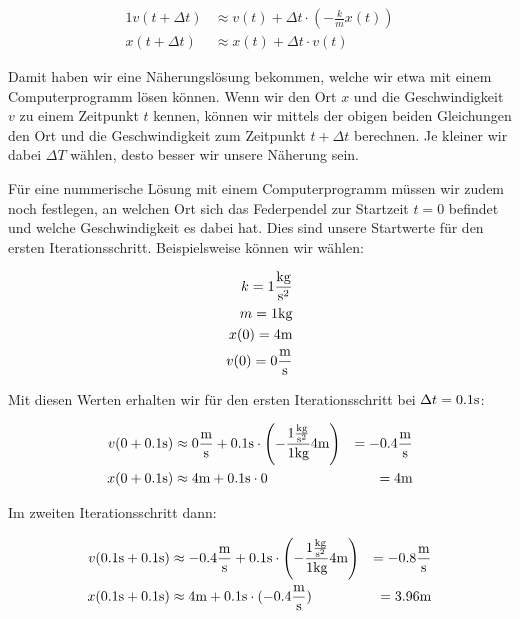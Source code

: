 \begin{alignat*}{1}
    v(t + \Delta t) &\approx v(t) + \Delta t \cdot \left(-\frac{k}{m}x(t)\right) \\
    x(t + \Delta t) &\approx x(t) + \Delta t \cdot v(t)
\end{alignat*}

Damit haben wir eine Näherungslösung bekommen, welche wir etwa mit einem Computerprogramm lösen können. Wenn wir den Ort $x$ und die Geschwindigkeit $v$ zu einem Zeitpunkt $t$ kennen, können wir mittels der obigen beiden Gleichungen den Ort und die Geschwindigkeit zum Zeitpunkt $t+\Delta t$ berechnen. Je kleiner wir dabei $\Delta T$ wählen, desto besser wir unsere Näherung sein.

Für eine nummerische Lösung mit einem Computerprogramm müssen wir zudem noch festlegen, an welchen Ort sich das Federpendel zur Startzeit $t=0$ befindet und welche Geschwindigkeit es dabei hat. Dies sind unsere Startwerte für den ersten Iterationsschritt. Beispielsweise können wir wählen:

\begin{alignat*}{1}
    k = 1 \frac{\text{kg}}{\text{s}^2} \\
    m = 1 \text{kg} \\
    x(0) = 4 \text{m} \\
    v(0) = 0 \frac{\text{m}}{\text{s}}
\end{alignat*}

Mit diesen Werten erhalten wir für den ersten Iterationsschritt  bei $\Delta t=0.1\text{s}$:

\begin{alignat*}{2}
    v(0 + 0.1 \text{s}) &\approx 0 \frac{\text{m}}{\text{s}} + 0.1 \text{s} \cdot \left(-\frac{1 \frac{\text{kg}}{\text{s}^2}}{1\text{kg}}4 \text{m} \right) &= -0.4 \frac{\text{m}}{\text{s}} \\
    x(0 + 0.1 \text{s}) &\approx 4 \text{m}     + 0.1 \text{s} \cdot 0                                          &= 4 \text{m}
\end{alignat*}

Im zweiten Iterationsschritt dann:

\begin{alignat*}{2}
    v(0.1\text{s} + 0.1 \text{s}) &\approx -0.4 \frac{\text{m}}{\text{s}} + 0.1 \text{s} \cdot \left(-\frac{1 \frac{\text{kg}}{\text{s}^2}}{1\text{kg}} 4 \text{m} \right) &= -0.8 \frac{\text{m}}{\text{s}} \\
    x(0.1\text{s} + 0.1 \text{s}) &\approx 4    \text{m}     + 0.1 \text{s} \cdot (-0.4 \frac{\text{m}}{\text{s}})                              &= 3.96 \text{m}
\end{alignat*}

